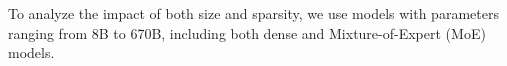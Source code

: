 To analyze the impact of both size and sparsity, we use models with parameters ranging from 8B to 670B, including both dense and Mixture-of-Expert (MoE) models.

